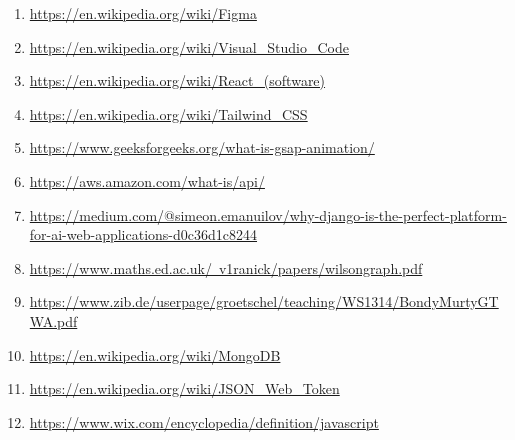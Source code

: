 \begin{enumerate}
\item \href{https://en.wikipedia.org/wiki/Figma}{https://en.wikipedia.org/wiki/Figma}

\item \href{https://en.wikipedia.org/wiki/Visual_Studio_Code}{https://en.wikipedia.org/wiki/Visual_Studio_Code}

\item \href{https://en.wikipedia.org/wiki/React_(software)}{https://en.wikipedia.org/wiki/React_(software)}

\item \href{https://en.wikipedia.org/wiki/Tailwind_CSS}{https://en.wikipedia.org/wiki/Tailwind_CSS}

\item \href{https://www.geeksforgeeks.org/what-is-gsap-animation/}{https://www.geeksforgeeks.org/what-is-gsap-animation/}

\item \href{https://aws.amazon.com/what-is/api/}{https://aws.amazon.com/what-is/api/}

\item \href{https://medium.com/@simeon.emanuilov/why-django-is-the-perfect-platform-for-ai-web-applications-d0c36d1c8244}{https://medium.com/@simeon.emanuilov/why-django-is-the-perfect-platform-for-ai-web-applications-d0c36d1c8244}

\item \href{https://www.maths.ed.ac.uk/~v1ranick/papers/wilsongraph.pdf}{https://www.maths.ed.ac.uk/~v1ranick/papers/wilsongraph.pdf}

\item \href{https://www.zib.de/userpage/groetschel/teaching/WS1314/BondyMurtyGTWA.pdf}{https://www.zib.de/userpage/groetschel/teaching/WS1314/BondyMurtyGTWA.pdf}

\item \href{https://en.wikipedia.org/wiki/MongoDB}{https://en.wikipedia.org/wiki/MongoDB}

\item \href{https://en.wikipedia.org/wiki/JSON_Web_Token}{https://en.wikipedia.org/wiki/JSON_Web_Token}

\item \href{https://www.wix.com/encyclopedia/definition/javascript}{https://www.wix.com/encyclopedia/definition/javascript}

\end{enumerate}